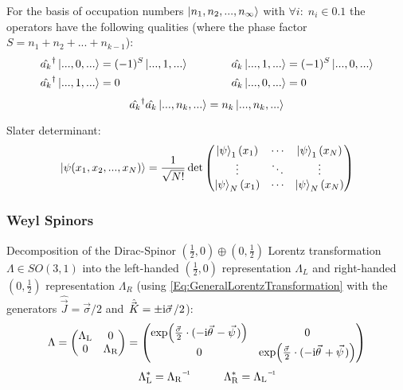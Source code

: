 			\noindent
			For the basis of occupation numbers $\Ket{n_1, n_2, ..., n_\infty}$ with $\forall i:\;n_i\in \qty{0,1}$ the operators have the following qualities (where the phase factor $S = n_1 + n_2 + ... + n_{k-1}$):
			\begin{equation}
				\begin{aligned}
					\hat{a_k}^\dagger \Ket{...,0,...} &= (-1)^S \Ket{...,1,...}
					&\hspace{30pt}
					\hat{a_k} \Ket{...,1,...} &= (-1)^S \Ket{...,0,...}
					\\
					\hat{a_k}^\dagger \Ket{...,1,...} &= 0
					&\hspace{30pt}
					\hat{a_k} \Ket{...,0,...} &= 0
				\end{aligned}
			\end{equation}
			\begin{equation}
				\hat{a_k}^\dagger \hat{a_k} \Ket{...,n_k,...} = n_k \Ket{...,n_k,...}
			\end{equation}

			\noindent
			Slater determinant:
			\begin{equation}
				\Ket{\psi(x_1,x_2,...,x_N)} = \frac{1}{\sqrt{N!}} \det\left( \begin{matrix}
						\Ket{\psi}_1(x_1) & \dotsb & \Ket{\psi}_1(x_N) \\
						\vdots            & \ddots & \vdots            \\
						\Ket{\psi}_N(x_1) & \dotsb & \Ket{\psi}_N(x_N) \\
					\end{matrix} \right)
			\end{equation}

		\subsubsection{Weyl Spinors}
			\noindent
			Decomposition of the Dirac-Spinor $(\frac{1}{2},0)\oplus(0,\frac{1}{2})$ Lorentz transformation $\Lambda\in SO(3,1)$ into the left-handed $(\frac{1}{2},0)$ representation $\Lambda_L$ and right-handed $(0,\frac{1}{2})$ representation $\Lambda_R$ (using \ref{Eq:GeneralLorentzTransformation} with the generators $\hat{\vec{J}} = \vec{\sigma}/2$ and $\hat{\vec{K}} = \pm \i\vec{\sigma}/2$):
			\begin{equation}
				\Lambda
				= \mqty(\Lambda_\text{L} & 0 \\ 0 & \Lambda_\text{R})
				= \mqty(
				\exp(\frac{\vec{\sigma}}{2}\cdot(-\i\vec{\theta} - \vec{\psi})) & 0 \\
				0 & \exp(\frac{\vec{\sigma}}{2}\cdot(-\i\vec{\theta} + \vec{\psi}))
				)
			\end{equation}
			\begin{equation}
				\Lambda_\text{L}^{*} = \inv{\Lambda_\text{R}} \hsp \Lambda_\text{R}^{*} = \inv{\Lambda_\text{L}}
			\end{equation}

